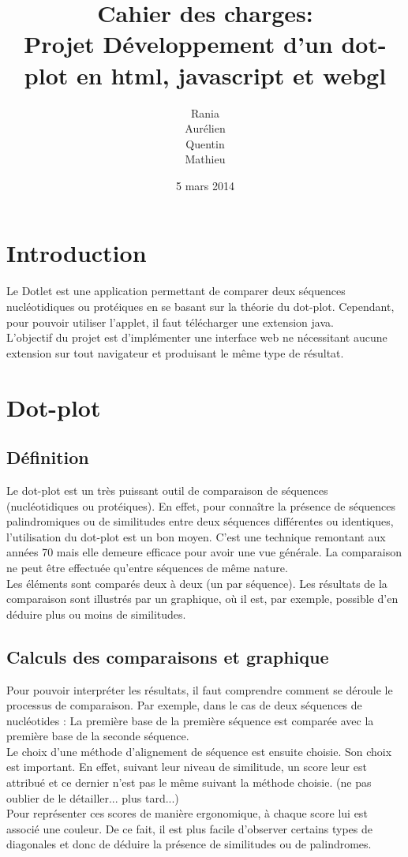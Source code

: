 \documentclass{report}
\title{Cahier des charges: \\Projet Développement d'un dot-plot en html, javascript et webgl }
\author{Rania \bsc{Assab} \\ Aurélien \bsc{Luciani}\\ Quentin \bsc{Riché-Piotaix}\\ Mathieu \bsc{Schaeffer}}
\date{5 mars 2014}
\begin{document}
\maketitle

\tableofcontents
{}

\chapter*{Introduction}

Le Dotlet est une application permettant de comparer deux séquences nucléotidiques ou protéiques en se basant sur la théorie du dot-plot. Cependant, pour pouvoir utiliser l'applet, il faut télécharger une extension java.\\
L'objectif du projet est d'implémenter une interface web ne nécessitant aucune extension sur tout navigateur et produisant le même type de résultat.\\


\chapter{Dot-plot}

\section{Définition}

Le dot-plot est un très puissant outil de comparaison de séquences (nucléotidiques ou protéiques). En effet, pour connaître la présence de séquences palindromiques ou de similitudes entre deux séquences différentes ou identiques, l'utilisation du dot-plot est un bon moyen. C'est une technique remontant aux années 70 mais elle demeure efficace pour avoir une vue 	générale.
La comparaison ne peut être effectuée qu'entre séquences de même nature.\\
Les éléments sont comparés deux à deux (un par séquence). Les résultats de la comparaison sont illustrés par un graphique, où il est, par exemple, possible d'en déduire plus ou moins de similitudes.\\

\section{Calculs des comparaisons et graphique}

Pour pouvoir interpréter les résultats, il faut comprendre comment se déroule le processus de comparaison. Par exemple, dans le cas de deux séquences de nucléotides : La première base de la première séquence est comparée avec la première base de la seconde séquence. \\
Le choix d'une méthode d'alignement de séquence est ensuite choisie. Son choix est important. En effet, suivant leur niveau de similitude, un score leur est attribué et ce dernier n'est pas le même suivant la méthode choisie. (ne pas oublier de le détailler... plus tard...)\\
Pour représenter ces scores de manière ergonomique, à chaque score lui est associé une couleur. De ce fait, il est plus facile d'observer certains types de diagonales et donc de déduire la présence de similitudes ou de palindromes.
\end{document}
